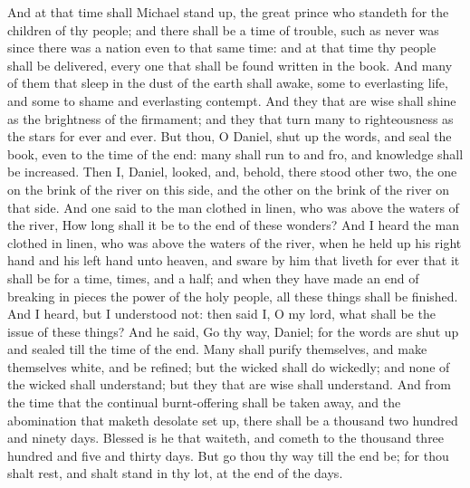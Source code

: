 And at that time shall Michael stand up, the great prince who standeth for the children of thy people; and there shall be a time of trouble, such as never was since there was a nation even to that same time: and at that time thy people shall be delivered, every one that shall be found written in the book. And many of them that sleep in the dust of the earth shall awake, some to everlasting life, and some to shame and everlasting contempt. And they that are wise shall shine as the brightness of the firmament; and they that turn many to righteousness as the stars for ever and ever. But thou, O Daniel, shut up the words, and seal the book, even to the time of the end: many shall run to and fro, and knowledge shall be increased.  Then I, Daniel, looked, and, behold, there stood other two, the one on the brink of the river on this side, and the other on the brink of the river on that side. And one said to the man clothed in linen, who was above the waters of the river, How long shall it be to the end of these wonders? And I heard the man clothed in linen, who was above the waters of the river, when he held up his right hand and his left hand unto heaven, and sware by him that liveth for ever that it shall be for a time, times, and a half; and when they have made an end of breaking in pieces the power of the holy people, all these things shall be finished. And I heard, but I understood not: then said I, O my lord, what shall be the issue of these things? And he said, Go thy way, Daniel; for the words are shut up and sealed till the time of the end. Many shall purify themselves, and make themselves white, and be refined; but the wicked shall do wickedly; and none of the wicked shall understand; but they that are wise shall understand. And from the time that the continual burnt-offering shall be taken away, and the abomination that maketh desolate set up, there shall be a thousand two hundred and ninety days. Blessed is he that waiteth, and cometh to the thousand three hundred and five and thirty days. But go thou thy way till the end be; for thou shalt rest, and shalt stand in thy lot, at the end of the days. 